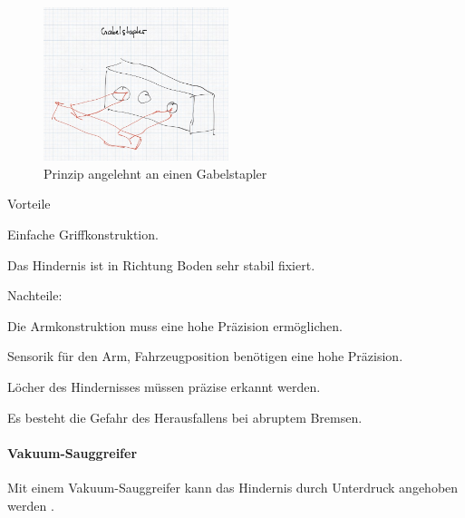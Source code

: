 \documentclass[../main.tex]{subfiles}
\begin{document}
\begin{figure}[h!]
        \centering
        \includegraphics[width=0.48\textwidth]{img/technologierecherche/Aufnahme/Gabelstapler.jpg}
        \caption{Prinzip angelehnt an einen Gabelstapler}
        \label{img:tech_Gaplerstapler}
\end{figure}

\begin{minipage}[t]{0.48\textwidth}
    \begin{items}
          \item [Vorteile]
          \item Einfache Griffkonstruktion.
          \item Das Hindernis ist in Richtung Boden sehr stabil fixiert.
    \end{items}
\end{minipage}
\hfill
\begin{minipage}[t]{0.48\textwidth}
    \begin{items}
    \item {Nachteile:}
    \item Die Armkonstruktion muss eine hohe Präzision ermöglichen.
    \item Sensorik für den Arm, Fahrzeugposition benötigen eine hohe Präzision.
    \item Löcher des Hindernisses müssen präzise erkannt werden.
    \item Es besteht die Gefahr des Herausfallens bei abruptem Bremsen.
    \end{items}
\end{minipage}
\newpage
\paragraph{Vakuum-Sauggreifer}
Mit einem Vakuum-Sauggreifer kann das Hindernis durch Unterdruck angehoben werden \cite{vakuumgreifer}.
\end{document}
